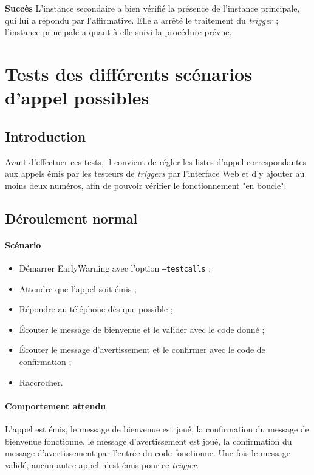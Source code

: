 \documentclass{article}
\begin{document}
\textbf{Succès} L'instance secondaire a bien vérifié la présence de l'instance principale, qui lui a répondu par l'affirmative. Elle a arrêté le traitement du \emph{trigger} ; l'instance principale a quant à elle suivi la procédure prévue.
\pagebreak
\section{Tests des différents scénarios d'appel possibles}

\subsection{Introduction}

Avant d'effectuer ces tests, il convient de régler les listes d'appel correspondantes aux appels émis par les testeurs de \emph{triggers} par l'interface Web et d'y ajouter au moins deux numéros, afin de pouvoir vérifier le fonctionnement "en boucle".

\subsection{Déroulement normal}

\paragraph{Scénario}

\begin{itemize}
    \item Démarrer EarlyWarning avec l'option \texttt{--testcalls} ;
    \item Attendre que l'appel soit émis ;
    \item Répondre au téléphone dès que possible ;
    \item Écouter le message de bienvenue et le valider avec le code donné ;
    \item Écouter le message d'avertissement et le confirmer avec le code de confirmation ;
    \item Raccrocher.
\end{itemize}

\paragraph{Comportement attendu\\}

L'appel est émis, le message de bienvenue est joué, la confirmation du message de bienvenue fonctionne, le message d'avertissement est joué, la confirmation du message d'avertissement par l'entrée du code fonctionne. Une fois le message validé, aucun autre appel n'est émis pour ce \emph{trigger}.
\end{document}
